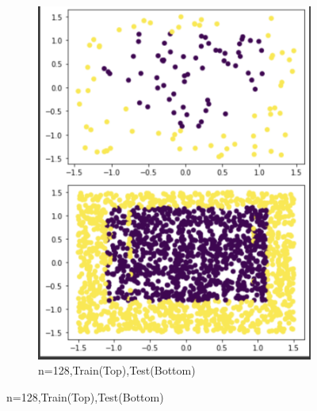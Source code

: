\documentclass[a4paper]{article}
\theoremstyle{definition}
\newenvironment{soln}{
    \leavevmode\color{blue}\ignorespaces
}{}
\begin{document}
\begin{enumerate}
\begin{soln}
\begin{figure}[H]
\begin{subfigure}{0.5\textwidth}
            \includegraphics[scale=0.5]{128.png}
            \caption{n=128,Train(Top),Test(Bottom)}
            \label{fig:q2}
        \end{subfigure}
        \end{figure} 
        \begin{figure}[H]
        \begin{subfigure}{0.5\textwidth}
            \centering

\end{subfigure}
\end{figure}
\end{soln}
\end{enumerate}
\end{document}
